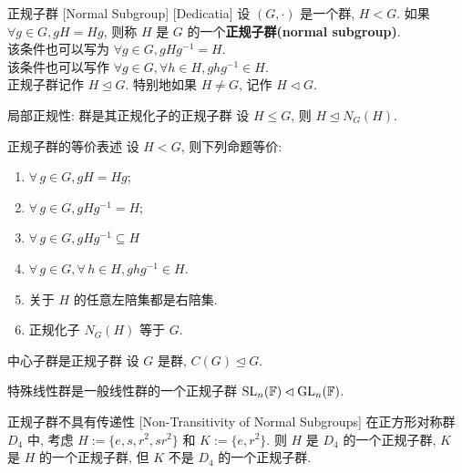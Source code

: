         \begin{dfn}
            {正规子群}
            [Normal Subgroup]
            [Dedicatia]
            设 \((G,\cdot)\) 是一个群, \(H<G\). 如果 \(\forall g\in G, gH=Hg\), 则称 \(H\) 是 \(G\) 的一个\textbf{正规子群(normal subgroup)}.\\
            该条件也可以写为 \(\forall g\in G, gHg^{-1}=H\).\\
            该条件也可以写作 \(\forall g\in G, \forall h\in H, ghg^{-1}\in H\).\\
            正规子群记作 \(H\trianglelefteq G\). 特别地如果 \(H\neq G\), 记作 \(H\lhd G\).
        \end{dfn}

        \begin{ppt}
            {局部正规性: 群是其正规化子的正规子群}
            设 \(H\leq G\), 则 \(H\trianglelefteq N_G(H)\).
        \end{ppt}

        \begin{ppt}
            {正规子群的等价表述}
            设 \(H<G\), 则下列命题等价:
            \begin{enumerate}[label=(\roman*)]
                \item \(\forall\,g\in G, gH=Hg\);
                \item \(\forall\,g\in G, gHg^{-1}=H\);
                \item \(\forall\,g\in G, gHg^{-1}\subseteq H\)
                \item \(\forall\,g\in G, \forall\,h\in H, ghg^{-1}\in H\).
                \item 关于 \(H\) 的任意左陪集都是右陪集.
                \item 正规化子 \(N_G(H)\) 等于 \(G\).
            \end{enumerate}
        \end{ppt}

        \begin{ppt}
            {中心子群是正规子群}
            设 \(G\) 是群, \(C(G)\trianglelefteq G\).
        \end{ppt}

        \begin{ins}
            {特殊线性群是一般线性群的一个正规子群}
            \(\operatorname{SL}_n(\operatorname{\mathbb{F}})\lhd\operatorname{GL}_n(\operatorname{\mathbb{F}})\).
        \end{ins}

        \begin{cxmp}
            {正规子群不具有传递性}
            [Non-Transitivity of Normal Subgroups]
            在正方形对称群 \(D_4\) 中, 考虑 \(H:=\{e, s, r^2, sr^2\}\) 和 \(K:=\{e, r^2\}\). 则 \(H\) 是 \(D_4\) 的一个正规子群, \(K\) 是 \(H\) 的一个正规子群, 但 \(K\) 不是 \(D_4\) 的一个正规子群.
        \end{cxmp}

